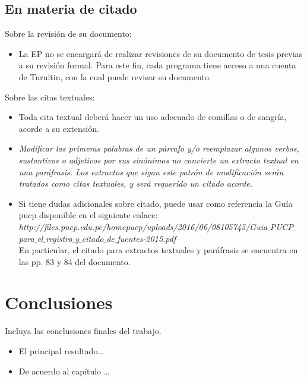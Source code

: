 \section{En materia de citado}%
Sobre la revisión de su documento:
\begin{itemize}
  \item La EP no se encargará de realizar revisiones de su documento de tesis previas a su revisión formal. Para este fin, cada programa tiene acceso a una cuenta de Turnitin, con la cual puede revisar su documento.
\end{itemize}
Sobre las citas textuales:
\begin{itemize}
  \item Toda cita textual deberá hacer un uso adecuado de comillas o de sangría, acorde a su extensión.
  \item \textit{Modificar las primeras palabras de un párrafo y/o reemplazar algunos verbos, sustantivos o adjetivos por sus sinónimos no convierte un extracto textual en una paráfrasis. Los extractos que sigan este patrón de modificación serán tratados como citas textuales, y será requerido un citado acorde.}
  \item Si tiene dudas adicionales sobre citado, puede usar como referencia la Guía {\sc pucp} disponible en el siguiente enlace:\\
      \emph{\small http://files.pucp.edu.pe/homepucp/uploads/2016/06/08105745/Guia$\_$PUCP$\_$ para$\_$el$\_$registro$\_$y$\_$citado$\_$de$\_$fuentes-2015.pdf}\\
      En particular, el citado para extractos textuales y paráfrasis se encuentra en las pp. 83 y 84 del documento.
\end{itemize}
\chapter*{Conclusiones}%
%
Incluya las conclusiones finales del trabajo.
%
\begin{itemize}
  \item El principal resultado\dots
  \item De acuerdo al cap\'itulo \dots
\end{itemize}
